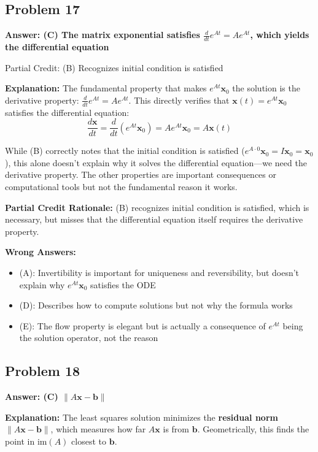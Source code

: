 \documentclass[12pt]{amsart}
\newcommand{\correct}[1]{{\color{correctgreen}\textbf{#1}}}
\newcommand{\partcred}[1]{{\color{partialblue}#1}}
\begin{document}
{\subsection*{Problem 17}
\correct{Answer: (C) The matrix exponential satisfies $\frac{d}{dt}e^{At} = Ae^{At}$, which yields the differential equation}

\partcred{Partial Credit: (B) Recognizes initial condition is satisfied}

\textbf{Explanation:} The fundamental property that makes $e^{At}\mathbf{x}_0$ the solution is the derivative property: $\frac{d}{dt}e^{At} = Ae^{At}$. This directly verifies that $\mathbf{x}(t) = e^{At}\mathbf{x}_0$ satisfies the differential equation:
$$\frac{d\mathbf{x}}{dt} = \frac{d}{dt}(e^{At}\mathbf{x}_0) = Ae^{At}\mathbf{x}_0 = A\mathbf{x}(t)$$

While (B) correctly notes that the initial condition is satisfied ($e^{A \cdot 0}\mathbf{x}_0 = I\mathbf{x}_0 = \mathbf{x}_0$), this alone doesn't explain why it solves the differential equation—we need the derivative property. The other properties are important consequences or computational tools but not the fundamental reason it works.

\textbf{Partial Credit Rationale:} (B) recognizes initial condition is satisfied, which is necessary, but misses that the differential equation itself requires the derivative property.

\textbf{Wrong Answers:}
\begin{itemize}
\item (A): Invertibility is important for uniqueness and reversibility, but doesn't explain why $e^{At}\mathbf{x}_0$ satisfies the ODE
\item (D): Describes how to compute solutions but not why the formula works
\item (E): The flow property is elegant but is actually a consequence of $e^{At}$ being the solution operator, not the reason
\end{itemize}

\subsection*{Problem 18}
\correct{Answer: (C) $\|A\mathbf{x} - \mathbf{b}\|$}

\textbf{Explanation:} The least squares solution minimizes the \textbf{residual norm} $\|A\mathbf{x} - \mathbf{b}\|$, which measures how far $A\mathbf{x}$ is from $\mathbf{b}$. Geometrically, this finds the point in $\text{im}(A)$ closest to $\mathbf{b}$.

}
\end{document}
